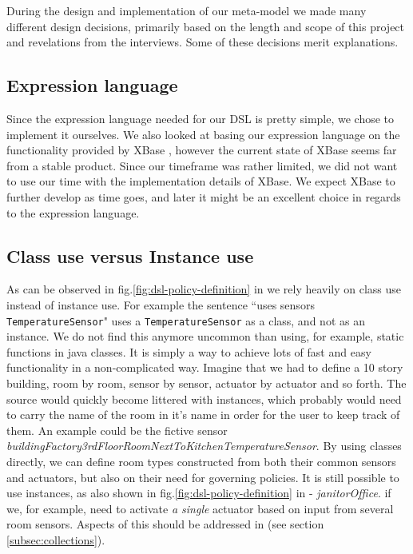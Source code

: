 During the design and implementation of our meta-model we made many different design decisions, primarily based on the length and scope of this project and revelations from the interviews. Some of these decisions merit explanations.

\subsection{Expression language}
Since the expression language needed for our DSL is pretty simple, we chose to implement it ourselves. We also looked at basing our expression language on the functionality provided by XBase \cite{xbase}, however the current state of XBase seems far from a stable product. Since our timeframe was rather limited, we did not want to use our time with the implementation details of XBase. We expect XBase to further develop as time goes, and later it might be an excellent choice in regards to the expression language.

\subsection{Class use versus Instance use}
As can be observed in fig.\ref{fig:dsl-policy-definition} in  we rely heavily on class use instead of instance use. For example the sentence ``uses sensors \texttt{TemperatureSensor}" uses a \texttt{TemperatureSensor} as a class, and not as an instance. We do not find this anymore uncommon than using, for example, static functions in java classes. It is simply a way to achieve lots of fast and easy functionality in a non-complicated way. Imagine that we had to define a 10 story building, room by room, sensor by sensor, actuator by actuator and so forth. The source would quickly become littered with instances, which probably would need to carry the name of the room in it's name in order for the user to keep track of them. An example could be the fictive sensor \textit{buildingFactory3rdFloorRoomNextToKitchenTemperatureSensor}. By using classes directly, we can define room types constructed from both their common sensors and actuators, but also on their need for governing policies. It is still possible to use instances, as also shown in fig.\ref{fig:dsl-policy-definition} in  - \textit{janitorOffice}. if we, for example, need to activate \textit{a single} actuator based on input from several room sensors. Aspects of this should be addressed in  (see section \ref{subsec:collections}).
